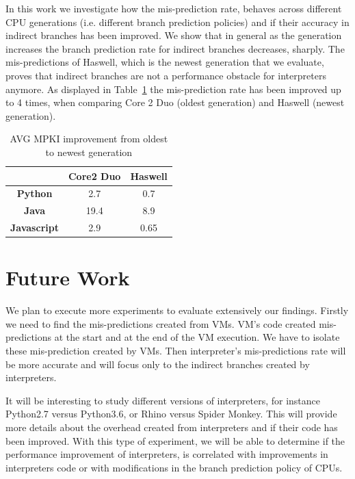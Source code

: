 \documentclass[parskip=full, paper=a4, fontsize=12pt]{scrartcl}
\numberwithin{equation}{section}
\numberwithin{figure}{section}
\numberwithin{table}{section}
\begin{document}
In this work we investigate how the mis-prediction rate, behaves across different CPU generations (i.e. different branch prediction policies) and if their accuracy in indirect branches has been improved. We show that in general as the generation increases the branch prediction rate for indirect branches decreases, sharply. The mis-predictions of Haswell, which is the newest generation that we evaluate, proves that indirect branches are not a performance obstacle for interpreters anymore. As displayed in Table~\ref{mpkiimprovement} the mis-prediction rate has been improved up to 4 times, when comparing Core 2 Duo (oldest generation) and Haswell (newest generation).    

\begin{table}[]
	\centering
		\begin{tabular}{@{}|c|c|c|@{}}
			\toprule
			\textbf{}           & \textbf{Core2 Duo} & \textbf{Haswell} \\ \midrule
			\textbf{Python}     & 2.7                & 0.7              \\ \midrule
			\textbf{Java}       & 19.4               & 8.9              \\ \midrule
			\textbf{Javascript} & 2.9                & 0.65             \\ \bottomrule
		\end{tabular}
	\caption{AVG MPKI improvement from oldest to newest generation}
	\label{mpkiimprovement}
\end{table}
\section{Future Work}
We plan to execute more experiments to evaluate extensively our findings.
Firstly we need to find the mis-predictions created from VMs. VM's code created mis-predictions at the start and at the end of the
VM execution. We have to isolate these mis-prediction created by
VMs. Then interpreter's mis-predictions rate will be more
accurate and will focus only to the indirect branches created by interpreters. 

It will be interesting to study different versions of interpreters, for instance Python2.7 versus Python3.6, or Rhino versus Spider Monkey. This will provide more details about the overhead created from interpreters and if their code has been improved. With this type of experiment, we will be able to determine
if the performance improvement of interpreters, is correlated with improvements in interpreters code or with modifications in the branch prediction policy of CPUs.  
\end{document}
